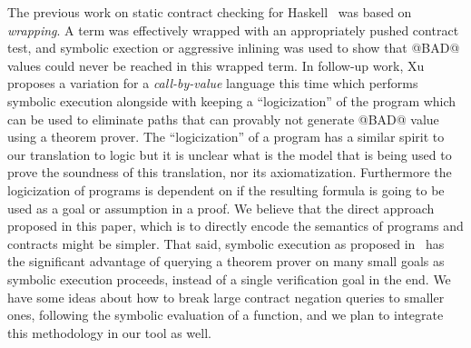 The previous work on static contract checking for Haskell~\cite{xu+:contracts} 
was based on {\em wrapping}. A term was effectively wrapped
with an appropriately pushed contract test, and symbolic exection or aggressive inlining was used to show that @BAD@ values could
never be reached in this wrapped term. 
In follow-up work, Xu~\cite{Xu:2012:HCC:2103746.2103767} proposes a variation for a 
{\em call-by-value} language this time which performs symbolic execution alongside with
keeping a ``logicization'' of the program which can be used to eliminate paths that can
provably not generate @BAD@ value using a theorem prover. The ``logicization'' of a 
program has a similar spirit to our translation to logic but it is unclear what is the
model that is being used to prove the soundness of this translation, nor its 
axiomatization. Furthermore the logicization of programs is dependent on if 
the resulting formula is going to be used as a goal or assumption in a proof. We believe
that the direct approach proposed in this paper, which is to directly encode the semantics
of programs and contracts might be simpler. That said, symbolic execution as proposed
in~\cite{Xu:2012:HCC:2103746.2103767} has the significant advantage of querying a 
theorem prover on many small goals as symbolic execution proceeds, instead of a 
single verification goal in the end. We have some ideas about how to break large 
contract negation queries to smaller ones, following the symbolic evaluation of 
a function, and we plan to integrate this methodology in our tool as well.

